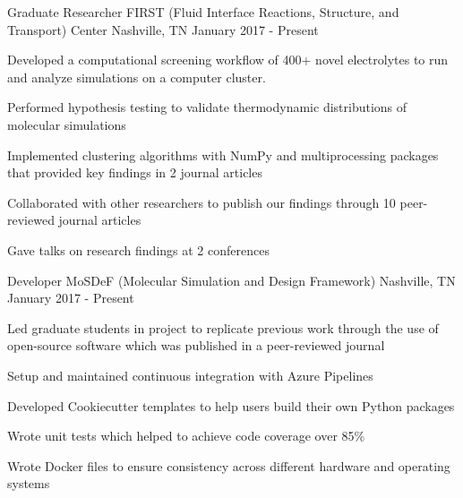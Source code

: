 
\begin{cventries}
  \cventry
    {Graduate Researcher} %
    {FIRST (Fluid Interface Reactions, Structure, and Transport) Center} %
    {Nashville, TN} %
    {January 2017 - Present} %
    {
      \begin{cvitems} %
        \item{Developed a computational screening workflow of 400+ novel electrolytes to
        run \newline
              and analyze simulations on a computer cluster.}
        \item{Performed hypothesis testing to validate thermodynamic
            distributions of molecular simulations}
        \item {Implemented clustering algorithms with NumPy and multiprocessing
            packages that
            provided \newline key findings in 2 journal articles}
        \item {Collaborated with other researchers to publish our findings
            through 10 peer-reviewed journal articles}
        \item{Gave talks on research findings at 2 conferences}
      \end{cvitems}
    }

  \cventry
    {Developer} %
    {MoSDeF (Molecular Simulation and Design Framework)} %
    {Nashville, TN} %
    {January 2017 - Present} %
    {
      \begin{cvitems} %
        \item{Led graduate students in project to replicate previous work
            through \newline the use of open-source software which was published in a
              peer-reviewed journal}
        \item{Setup and maintained continuous integration with Azure Pipelines}
        \item{Developed Cookiecutter templates to help users build 
            their own Python packages}
        \item{Wrote unit tests which helped to achieve code coverage over
            85\%}
        \item{Wrote Docker files to ensure consistency across different hardware
            and operating systems}
      \end{cvitems}
    }
\end{cventries}

